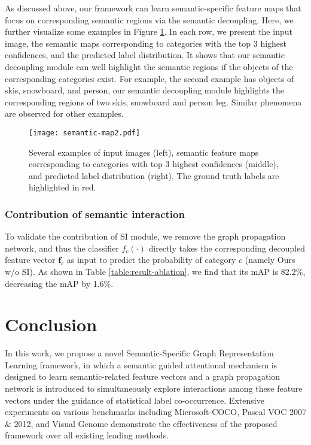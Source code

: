 \documentclass[10pt,twocolumn,letterpaper]{article}
\begin{document}
As discussed above, our framework can learn semantic-specific feature maps that focus on corresponding semantic regions via the semantic decoupling. Here, we further visualize some examples in Figure \ref{fig:semantic-map}. In each row, we present the input image, the semantic maps corresponding to categories with the top 3 highest confidences, and the predicted label distribution. It shows that our semantic decoupling module can well highlight the semantic regions if the objects of the corresponding categories exist. For example, the second example has objects of skis, snowboard, and person, our semantic decoupling module highlights the corresponding regions of two skis, snowboard and person leg. Similar phenomena are observed for other examples.

\begin{figure}[!t]
   \centering
   \texttt{[image: semantic-map2.pdf]} \caption{Several examples of input images (left), semantic feature maps corresponding to categories with top 3 highest confidences (middle), and predicted label distribution (right). The ground truth labels are highlighted in red.}
   \label{fig:semantic-map}
   \vspace{-8pt}
\end{figure}


\subsubsection{Contribution of semantic interaction}
To validate the contribution of SI module, we remove the graph propagation network, and thus the classifier $f_c(\cdot)$ directly takes the corresponding decoupled feature vector $\mathbf{f}_c$ as input to predict the probability of category $c$ (namely Ours w/o SI). As shown in Table \ref{table:result-ablation}, we find that its mAP is 82.2\%, decreasing the mAP by 1.6\%.


\section{Conclusion}
In this work, we propose a novel Semantic-Specific Graph Representation Learning framework, in which a semantic guided attentional mechanism is designed to learn semantic-related feature vectors and a graph propagation network is introduced to simultaneously explore interactions among these feature vectors under the guidance of statistical label co-occurrence. Extensive experiments on various benchmarks including Microsoft-COCO, Pascal VOC 2007 \& 2012, and Visual Genome demonstrate the effectiveness of the proposed framework over all existing leading methods.


{\small


}
\end{document}
